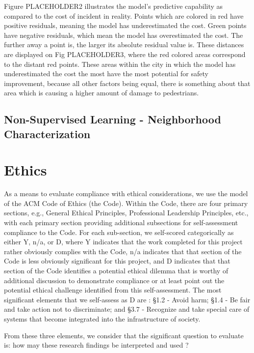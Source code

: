 \documentclass{llncs}
\begin{document}
Figure PLACEHOLDER2 illustrates the model’s predictive capability as compared to the cost of incident in reality. Points which are colored in red have positive residuals, meaning the model has underestimated the cost. Green points have negative residuals, which mean the model has overestimated the cost. The further away a point is, the larger its absolute residual value is. These distances are displayed on Fig PLACEHOLDER3, where the red colored areas correspond to the distant red points. These areas within the city in which the model has underestimated the cost the most have the most potential for safety improvement, because all other factors being equal, there is something about that area which is causing a higher amount of damage to pedestrians.

\subsection{Non-Supervised Learning - Neighborhood Characterization}

%
\section{Ethics}
%
As a means to evaluate compliance with ethical considerations, we use the model of the ACM Code of Ethics  (the Code). Within the Code, there are four primary sections, e.g., General Ethical Principles, Professional Leadership Principles, etc., with each primary section providing additional subsections for self-assessment compliance to the Code. For each sub-section, we self-scored categorically as either Y, n/a, or D, where Y indicates that the work completed for this project rather obviously complies with the Code, n/a indicates that that section of the Code is less obviously significant for this project, and D indicates that that section of the Code identifies a potential ethical dilemma that is worthy of additional discussion to demonstrate compliance or at least point out the potential ethical challenge identified from this self-assessment.
The most significant elements that we self-assess as D are : \S 1.2 - Avoid harm; \S 1.4 - Be fair and take action not to discriminate; and \S 3.7 - Recognize and take special care of systems that become integrated into the infrastructure of society.

From these three elements, we consider that the significant question to evaluate is: how may these research findings be interpreted and used ?
\end{document}
